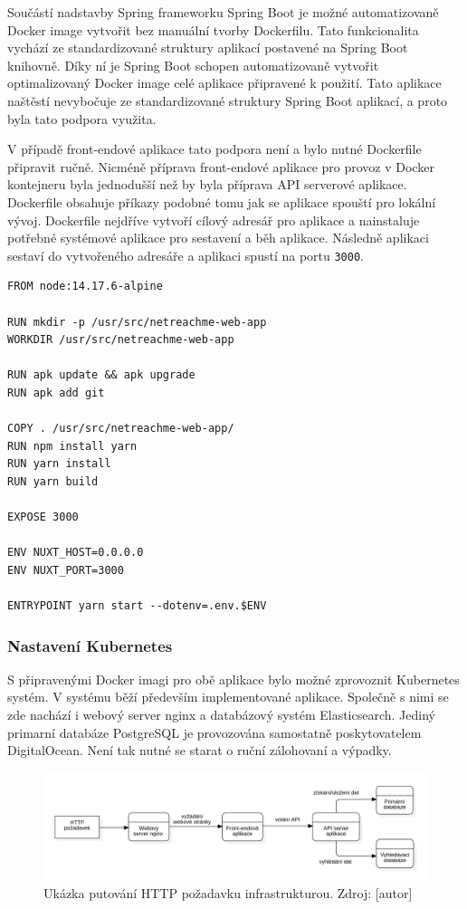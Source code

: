 		Součástí nadstavby Spring frameworku Spring Boot je možné automatizovaně Docker image vytvořit bez manuální tvorby
		Dockerfilu.
		Tato funkcionalita vychází ze standardizované struktury aplikací postavené na Spring Boot knihovně.
		Díky ní je Spring Boot schopen automatizovaně vytvořit optimalizovaný Docker image celé aplikace připravené k
		použití.
		Tato aplikace naštěstí nevybočuje ze standardizované struktury Spring Boot aplikací, a proto byla tato podpora využita.

		V případě front-endové aplikace tato podpora není a bylo nutné Dockerfile připravit ručně.
		Nicméně příprava front-endové aplikace pro provoz v Docker kontejneru byla jednodušší než by byla příprava \ac{API}
		serverové aplikace.
		Dockerfile obsahuje příkazy podobné tomu jak se aplikace spouští pro lokální vývoj.
		Dockerfile nejdříve vytvoří cílový adresář pro aplikace a nainstaluje potřebné systémové aplikace pro sestavení
		a běh aplikace.
		Následně aplikaci sestaví do vytvořeného adresáře a aplikaci spustí na portu \lstinline{3000}.

		\begin{lstlisting}[caption={Dockerfile spouštějící front-endovou aplikaci v Dockeru. Zdroj: [autor]}]
FROM node:14.17.6-alpine

RUN mkdir -p /usr/src/netreachme-web-app
WORKDIR /usr/src/netreachme-web-app

RUN apk update && apk upgrade
RUN apk add git

COPY . /usr/src/netreachme-web-app/
RUN npm install yarn
RUN yarn install
RUN yarn build

EXPOSE 3000

ENV NUXT_HOST=0.0.0.0
ENV NUXT_PORT=3000

ENTRYPOINT yarn start --dotenv=.env.$ENV
		\end{lstlisting}

		\subsubsection{Nastavení Kubernetes}

		S připravenými Docker imagi pro obě aplikace bylo možné zprovoznit Kubernetes systém.
		V systému běží především implementované aplikace.
		Společně s nimi se zde nachází i webový server nginx a databázový systém Elasticsearch.
		Jediný primarní databáze PostgreSQL je provozována samostatně poskytovatelem DigitalOcean.
		Není tak nutné se starat o ruční zálohovaní a výpadky.

		\begin{figure}[H]
			\centering
			\includegraphics[width=\linewidth]{obrazky/architektura_produkce}\hfill
			\caption{Ukázka putování HTTP požadavku infrastrukturou. Zdroj: [autor]}
		\end{figure}

